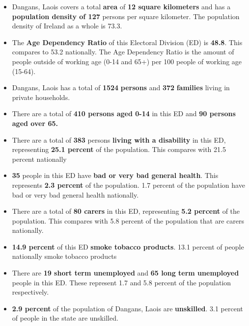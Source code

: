 \documentclass{article}
\begin{document}
\begin{itemize}

\item Dangans, Laois covers a total \textbf{area} of  \textbf{12 square kilometers} and has a \textbf{population density of 127} persons per square kilometer. The population density of Ireland as a whole is  73.3. 

\item The \textbf{Age Dependency Ratio} of this Electoral Division (ED) is  \textbf{48.8}. This compares to 53.2 nationally. The Age Dependency Ratio is the amount of people outside of working age (0-14 and 65+) per 100 people of working age (15-64). 

\item Dangans, Laois has a total of \textbf{1524} \textbf{persons} and  \textbf{372} \textbf{families} living in private households.

\item There are a total of \textbf{410 persons aged 0-14} in this ED and \textbf{90 persons aged over 65.} 

\item There are a total of \textbf{383} persons \textbf{living with a disability} in this ED, representing \textbf{25.1 percent} of the population. This compares with  21.5 percent nationally

\item \textbf{35} people in this ED have \textbf{bad or very bad general health}. This represents \textbf{2.3 percent} of the population. 1.7 percent of the population have bad or very bad general health nationally. 

\item There are a total of \textbf{80 carers} in this ED, representing \textbf{5.2 percent} of the population. This compares with 5.8 percent of the population that are carers nationally. 

\item \textbf{14.9 percent} of this ED \textbf{smoke tobacco products}. 13.1 percent of people nationally smoke tobacco products

\item There are \textbf{19 short term unemployed} and \textbf{65 long term unemployed} people in this ED. These represent 1.7 and 5.8 percent of the population respectively.

\item  \textbf{2.9 percent} of the population of Dangans, Laois are \textbf{unskilled}. 3.1 percent of people in the state are unskilled.


\end{itemize}
\end{document}
